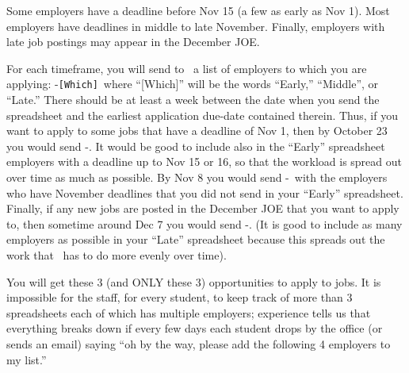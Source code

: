 \documentclass{econtex}
\begin{document}
Some employers have a deadline before Nov 15 (a few as early as Nov
1).  Most employers have deadlines in middle to late November.
Finally, employers with late job postings may appear in the December
JOE.

For each timeframe, you will send to \JMStaffEmail~a list of employers
to which you are applying: \EM-\texttt{[Which]}~where ``[Which]'' will
be the words ``Early,'' ``Middle'', or ``Late.''  There should be at 
least a week between the date when you send the spreadsheet and the
earliest application due-date contained therein.  Thus, if you want to
apply to some jobs that have a deadline of Nov 1, then by October 23
you would send \EM-\Early.  It would be good to include also in the
``Early'' spreadsheet employers with a deadline up to Nov 15 or 16, 
so that the workload is spread out over time as much as possible.  
By Nov 8 you would send \EM-\Mid~with the employers
who have November deadlines that you did not send in your ``Early''
spreadsheet.  Finally, if any new jobs are posted in the December JOE
that you want to apply to, then sometime around Dec 7 you would send
\EM-\Late.  (It is good to include as many employers as possible in
your ``Late'' spreadsheet because this spreads out the work that
\JMStaff~has to do more evenly over time).

You will get these 3 (and ONLY these 3) opportunities to apply to
jobs.  It is impossible for the staff, for every student, to keep
track of more than 3 spreadsheets each of which has multiple
employers; experience tells us that everything breaks down if every
few days each student drops by the office (or sends an email) saying
``oh by the way, please add the following 4 employers to my list.''
\end{document}
